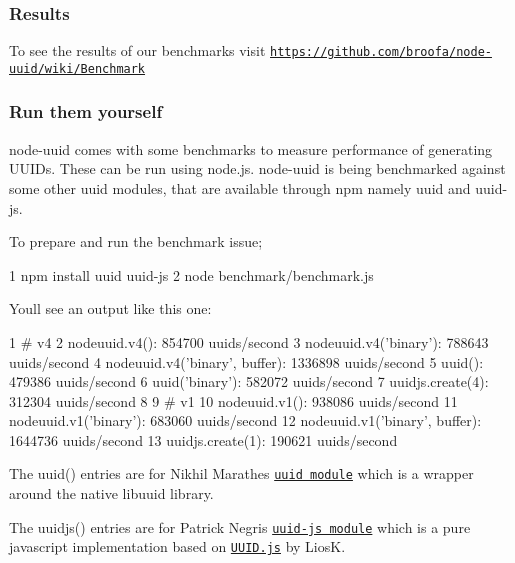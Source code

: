 \subsubsection*{Results}

To see the results of our benchmarks visit \href{https://github.com/broofa/node-uuid/wiki/Benchmark}{\tt https\+://github.\+com/broofa/node-\/uuid/wiki/\+Benchmark}

\subsubsection*{Run them yourself}

node-\/uuid comes with some benchmarks to measure performance of generating U\+U\+I\+Ds. These can be run using node.\+js. node-\/uuid is being benchmarked against some other uuid modules, that are available through npm namely {\ttfamily uuid} and {\ttfamily uuid-\/js}.

To prepare and run the benchmark issue;


\begin{DoxyCode}
1 npm install uuid uuid-js
2 node benchmark/benchmark.js
\end{DoxyCode}


You\textquotesingle{}ll see an output like this one\+:


\begin{DoxyCode}
1 # v4
2 nodeuuid.v4(): 854700 uuids/second
3 nodeuuid.v4('binary'): 788643 uuids/second
4 nodeuuid.v4('binary', buffer): 1336898 uuids/second
5 uuid(): 479386 uuids/second
6 uuid('binary'): 582072 uuids/second
7 uuidjs.create(4): 312304 uuids/second
8 
9 # v1
10 nodeuuid.v1(): 938086 uuids/second
11 nodeuuid.v1('binary'): 683060 uuids/second
12 nodeuuid.v1('binary', buffer): 1644736 uuids/second
13 uuidjs.create(1): 190621 uuids/second
\end{DoxyCode}



\begin{DoxyItemize}
\item The {\ttfamily uuid()} entries are for Nikhil Marathe\textquotesingle{}s \href{https://bitbucket.org/nikhilm/uuidjs}{\tt uuid module} which is a wrapper around the native libuuid library.
\item The {\ttfamily uuidjs()} entries are for Patrick Negri\textquotesingle{}s \href{https://github.com/pnegri/uuid-js}{\tt uuid-\/js module} which is a pure javascript implementation based on \href{https://github.com/LiosK/UUID.js}{\tt U\+U\+I\+D.\+js} by Lios\+K.
\end{DoxyItemize}

